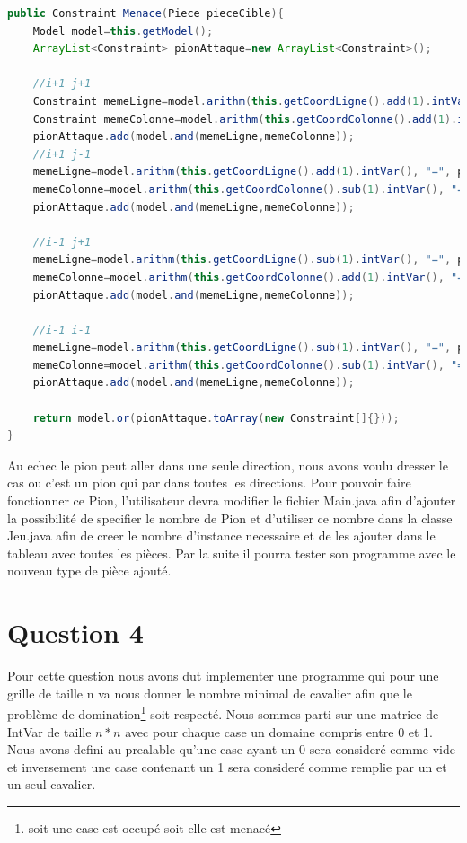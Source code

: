 \documentclass[a4paper,10pt]{article}
\begin{document}
\begin{lstlisting}[language=Java,basicstyle=\tiny]
public Constraint Menace(Piece pieceCible){
	Model model=this.getModel();
	ArrayList<Constraint> pionAttaque=new ArrayList<Constraint>();
	
	//i+1 j+1
	Constraint memeLigne=model.arithm(this.getCoordLigne().add(1).intVar(), "=", pieceCible.getCoordLigne());
	Constraint memeColonne=model.arithm(this.getCoordColonne().add(1).intVar(), "=", pieceCible.getCoordColonne());
	pionAttaque.add(model.and(memeLigne,memeColonne));
	//i+1 j-1
	memeLigne=model.arithm(this.getCoordLigne().add(1).intVar(), "=", pieceCible.getCoordLigne());
	memeColonne=model.arithm(this.getCoordColonne().sub(1).intVar(), "=", pieceCible.getCoordColonne());
	pionAttaque.add(model.and(memeLigne,memeColonne));
	
	//i-1 j+1
	memeLigne=model.arithm(this.getCoordLigne().sub(1).intVar(), "=", pieceCible.getCoordLigne());
	memeColonne=model.arithm(this.getCoordColonne().add(1).intVar(), "=", pieceCible.getCoordColonne());
	pionAttaque.add(model.and(memeLigne,memeColonne));
	
	//i-1 i-1
	memeLigne=model.arithm(this.getCoordLigne().sub(1).intVar(), "=", pieceCible.getCoordLigne());
	memeColonne=model.arithm(this.getCoordColonne().sub(1).intVar(), "=", pieceCible.getCoordColonne());
	pionAttaque.add(model.and(memeLigne,memeColonne));
	
	return model.or(pionAttaque.toArray(new Constraint[]{}));
}
\end{lstlisting}

Au echec le pion peut aller dans une seule direction, nous avons voulu dresser le cas ou c'est un pion qui par dans toutes les directions. Pour pouvoir faire fonctionner ce Pion, l'utilisateur devra modifier le fichier Main.java afin d'ajouter la possibilité de specifier le nombre de Pion et d'utiliser ce nombre dans la classe Jeu.java afin de creer le nombre d'instance necessaire et de les ajouter dans le tableau avec toutes les pièces. Par la suite il pourra tester son programme avec le nouveau type de pièce ajouté.
\section{Question 4}
\par Pour cette question nous avons dut implementer une programme qui pour une grille de taille n va nous donner le nombre minimal de cavalier afin que le problème de domination\footnote{soit une case est occupé soit elle est menacé} soit respecté. Nous sommes parti sur une matrice de IntVar de taille $n*n$ avec pour chaque case un domaine compris entre 0 et 1. Nous avons defini au prealable qu'une case ayant un 0 sera consideré comme vide et inversement une case contenant un 1 sera consideré comme remplie par un et un seul cavalier. 
\end{document}

